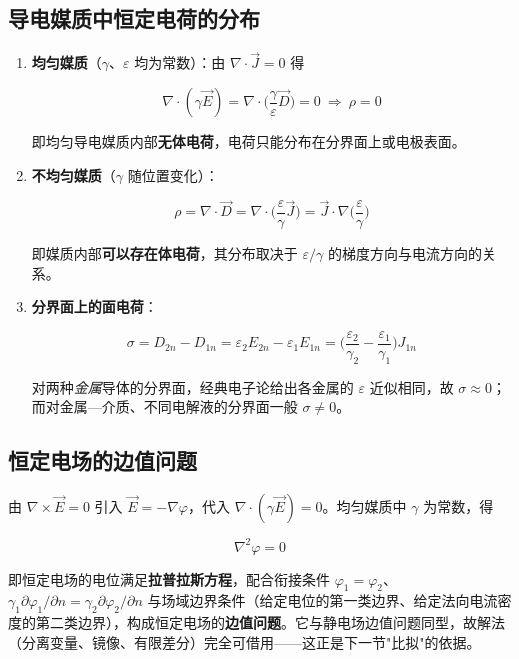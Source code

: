 \subsection{导电媒质中恒定电荷的分布}
\begin{enumerate}
  \item \textbf{均匀媒质}（$\gamma$、$\varepsilon$ 均为常数）：由 $\nabla\cdot\vec{J}=0$ 得
  \begin{formulaBox}
  \[
  \nabla\cdot(\gamma\vec{E})=\nabla\cdot\Big(\frac{\gamma}{\varepsilon}\vec{D}\Big)=0
  \ \Longrightarrow\ \rho=0
  \]
  \end{formulaBox}
  即均匀导电媒质内部\textbf{无体电荷}，电荷只能分布在分界面上或电极表面。
  \item \textbf{不均匀媒质}（$\gamma$ 随位置变化）：
  \begin{formulaBox}
  \[
  \rho=\nabla\cdot\vec{D}=\nabla\cdot\Big(\frac{\varepsilon}{\gamma}\vec{J}\Big)
  =\vec{J}\cdot\nabla\Big(\frac{\varepsilon}{\gamma}\Big)
  \]
  \end{formulaBox}
  即媒质内部\textbf{可以存在体电荷}，其分布取决于 $\varepsilon/\gamma$ 的梯度方向与电流方向的关系。
  \item \textbf{分界面上的面电荷}：
  \begin{formulaBox}
  \[
  \sigma=D_{2n}-D_{1n}=\varepsilon_2E_{2n}-\varepsilon_1E_{1n}
  =\Big(\frac{\varepsilon_2}{\gamma_2}-\frac{\varepsilon_1}{\gamma_1}\Big)J_{1n}
  \]
  \end{formulaBox}
  对两种\emph{金属}导体的分界面，经典电子论给出各金属的 $\varepsilon$ 近似相同，故 $\sigma\approx0$；而对金属—介质、不同电解液的分界面一般 $\sigma\neq0$。
\end{enumerate}

\subsection{恒定电场的边值问题}
由 $\nabla\times\vec{E}=0$ 引入 $\vec{E}=-\nabla\varphi$，代入 $\nabla\cdot(\gamma\vec{E})=0$。均匀媒质中 $\gamma$ 为常数，得
\begin{formulaBox}
\[
\nabla^2\varphi=0
\]
\end{formulaBox}
即恒定电场的电位满足\textbf{拉普拉斯方程}，配合衔接条件 $\varphi_1=\varphi_2$、$\gamma_1\partial\varphi_1/\partial n=\gamma_2\partial\varphi_2/\partial n$ 与场域边界条件（给定电位的第一类边界、给定法向电流密度的第二类边界），构成恒定电场的\textbf{边值问题}。它与静电场边值问题同型，故解法（分离变量、镜像、有限差分）完全可借用——这正是下一节"比拟"的依据。

